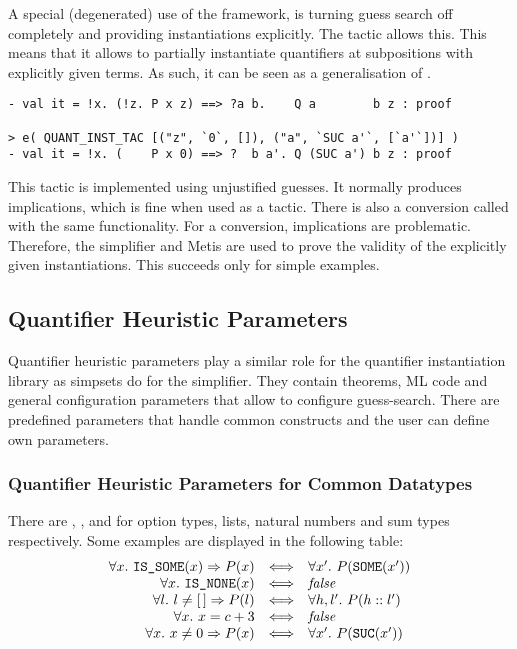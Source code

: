 A special (degenerated) use of the framework, is turning guess search off completely and
providing instantiations explicitly. The tactic  allows this. This means that
it allows to partially instantiate quantifiers at subpositions
with explicitly given terms. As such, it can be seen as
a generalisation of .
%
\begin{session}
\begin{verbatim}
- val it = !x. (!z. P x z) ==> ?a b.    Q a        b z : proof

> e( QUANT_INST_TAC [("z", `0`, []), ("a", `SUC a'`, [`a'`])] )
- val it = !x. (    P x 0) ==> ?  b a'. Q (SUC a') b z : proof
\end{verbatim}
\end{session}
%
This tactic is implemented using unjustified guesses. It normally
produces implications, which is fine when used as a tactic. There is
also a conversion called  with the same
functionality. For a conversion, implications are
problematic. Therefore, the simplifier and Metis are used to prove
the validity of the explicitly given instantiations. This succeeds
only for simple examples.


\subsection{Quantifier Heuristic Parameters}\label{quantHeu-subsec-qps}

Quantifier heuristic parameters play a similar role for the quantifier
instantiation library as simpsets do for the simplifier. They contain
theorems, ML code and general configuration parameters that allow to configure
guess-search. There are predefined parameters that handle
common constructs and the user can define own parameters.

\subsubsection{Quantifier Heuristic Parameters for Common Datatypes}

There are , ,  and  for option types, lists,
natural numbers and sum types respectively.
Some examples are displayed in the following table:
%
\[\begin{array}{r@{\quad \Longleftrightarrow \quad}l}
\forall x.\ \holtxt{IS\_SOME}(x) \Rightarrow P(x) & \forall x'.\ P (\holtxt{SOME}(x')) \\
\forall x.\ \holtxt{IS\_NONE}(x)& \textit{false} \\
\forall l.\ l \neq [\,] \Rightarrow P(l)& \forall h, l'.\ P(h::l')  \\
\forall x.\ x = c + 3& \textit{false} \\
\forall x.\ x \neq 0 \Rightarrow P(x)& \forall x'.\ P(\holtxt{SUC}(x'))
\end{array}\]

